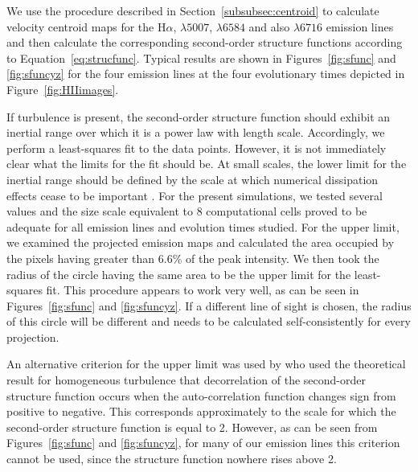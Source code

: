\documentclass[useAMS,usenatbib]{mn2e}
\begin{document}
We use the procedure described in Section~\ref{subsubsec:centroid} to
calculate velocity centroid maps for the H$\alpha$, \oiii$\lambda
5007$, \nii$\lambda 6584$ and also \sii$\lambda 6716$ emission lines
and then calculate the corresponding second-order structure functions
according to Equation~\ref{eq:strucfunc}. Typical results are shown in
Figures~\ref{fig:sfunc} and \ref{fig:sfuncyz} for the four emission lines at the four 
evolutionary times depicted in Figure~\ref{fig:HIIimages}.

If turbulence is present, the second-order structure function should exhibit an
inertial range over which it is a power law with
length scale. Accordingly, we perform a least-squares fit to the data
points. However, it is not immediately clear what the limits for the
fit should be. At small scales, the lower limit for the inertial range
should be defined by the scale at which numerical dissipation effects
cease to be important \citep {2004ApJ...604..196B}. For the present
simulations, we tested several values and the size scale equivalent to
8 computational cells proved to be adequate for all emission lines and
evolution times studied. For the upper limit, we examined the
projected emission maps and calculated the area occupied by the pixels
having greater than 6.6\% of the peak intensity. We then took the
radius of the circle having the same area to be the upper limit for the
least-squares fit. This procedure appears to work very well, as can be
seen in Figures~\ref{fig:sfunc} and \ref{fig:sfuncyz}. If a different
line of sight is chosen, the radius of this circle will be different and needs to be
calculated self-consistently for every projection.

An alternative criterion for the upper limit was used by \citet
{2011MNRAS.413..721L} who used the theoretical result for homogeneous
turbulence that decorrelation of the second-order structure function
occurs when the auto-correlation function changes sign from positive to
negative. This corresponds approximately to the scale for which the
second-order structure function is equal to 2. However, as can be seen
from Figures~\ref{fig:sfunc} and \ref{fig:sfuncyz}, 
for many of our emission lines this criterion cannot be used,
since the structure function nowhere rises above 2.
\end{document}
